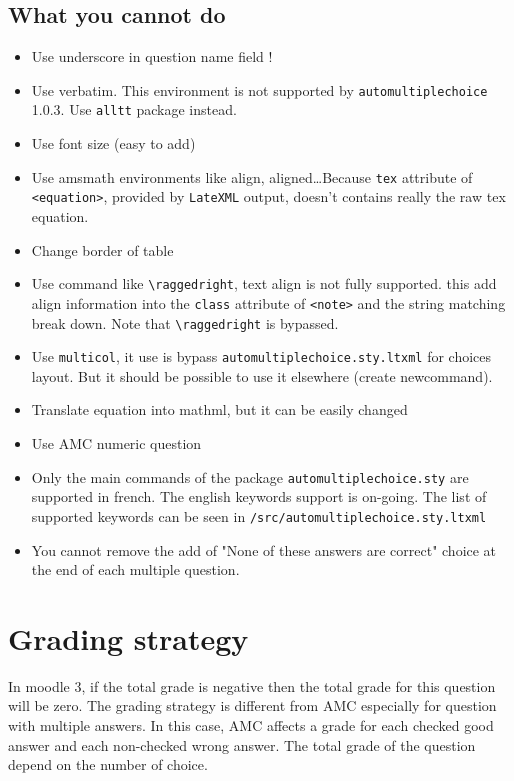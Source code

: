 \documentclass[a4paper]{article}
\newcommand{\elem}[1]{\texttt{<#1>}}
\begin{document}
\subsection{What you cannot do}\label{sec:cannot}
\begin{itemize}
\item Use underscore in question name field !
\item Use verbatim. This environment is not supported by \texttt{automultiplechoice} 1.0.3. Use \texttt{alltt} package instead.
\item Use font size (easy to add)
\item Use amsmath environments like align, aligned\dots Because  \texttt{tex} attribute of \elem{equation}, provided by \texttt{LateXML} output, doesn't contains really the raw tex equation.
\item Change border of table
\item Use command like \texttt{\textbackslash raggedright}, text align is not fully supported. this add align information into the \texttt{class} attribute of \elem{note} and the string matching break down. Note that \texttt{\textbackslash raggedright} is bypassed. %
\item Use \texttt{multicol}, it use is bypass \texttt{automultiplechoice.sty.ltxml} for choices layout. But it should be possible to use it elsewhere (create newcommand).
\item Translate equation into mathml, but it can be easily changed
\item Use AMC numeric question
\item Only the main commands of the package \texttt{automultiplechoice.sty} are supported in french. The english keywords support is on-going. The list of supported keywords can be seen in \texttt{/src/automultiplechoice.sty.ltxml}
\item You cannot remove the add of "None of these answers are correct" choice at the end of each multiple question.


\end{itemize}
 
\section{Grading strategy}
In moodle 3, if the total grade is negative then the total grade for this question will be zero. The grading strategy is different from AMC especially for question with multiple answers. In this case, AMC affects a grade for each checked good answer and each non-checked wrong answer. The total grade of the question depend on the number of choice.
\end{document}
